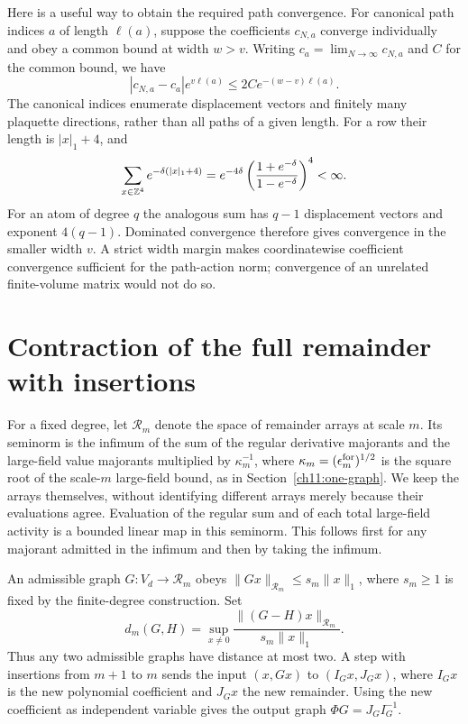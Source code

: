 Here is a useful way to obtain the required path convergence. For
canonical path indices $a$ of length $\ell(a)$, suppose the coefficients
$c_{N,a}$ converge individually and obey a common bound at width
$w>v$. Writing $c_a=\lim_{N\to\infty}c_{N,a}$ and $C$ for the common bound, we have
\[
 |c_{N,a}-c_a|e^{v\ell(a)}\le 2C e^{-(w-v)\ell(a)}.
\]
The canonical indices enumerate displacement vectors and finitely many
plaquette directions, rather than all paths of a given length. For a
row their length is $|x|_1+4$, and
\[
 \sum_{x\in\mathbb Z^4}e^{-\delta(|x|_1+4)}
 =e^{-4\delta}\left(\frac{1+e^{-\delta}}{1-e^{-\delta}}\right)^4<\infty.
\]
For an atom of degree $q$ the analogous sum has $q-1$ displacement
vectors and exponent $4(q-1)$. Dominated convergence therefore gives
convergence in the smaller width $v$. A strict width margin makes
coordinatewise coefficient convergence sufficient for the
path-action norm; convergence of an unrelated finite-volume matrix
would not do so.

\section{Contraction of the full remainder with insertions}
\label{ch12:graphs}

For a fixed degree, let $\mathcal R_m$ denote the space of remainder
arrays at scale $m$. Its seminorm is the infimum of the sum of the
regular derivative majorants and the large-field value majorants
multiplied by $\kappa_m^{-1}$, where
$\kappa_m=(\epsilon_m^{\rm for})^{1/2}$ is the square root of the
scale-$m$ large-field bound, as in
Section~\ref{ch11:one-graph}. We keep the arrays themselves, without
identifying different arrays merely because their evaluations agree.
Evaluation of the regular sum and of each total large-field activity is a
bounded linear map in this seminorm. This follows first for any
majorant admitted in the infimum and then by taking the infimum.

An admissible graph $G:V_d\to\mathcal R_m$ obeys
$\|Gx\|_{\mathcal R_m}\le s_m\|x\|_1$, where $s_m\ge1$ is fixed
by the finite-degree construction. Set
\[
 d_m(G,H)=\sup_{x\ne0}
       \frac{\|(G-H)x\|_{\mathcal R_m}}{s_m\|x\|_1}.
\]
Thus any two admissible graphs have distance at most two. A step with insertions
from $m+1$ to $m$ sends the input $(x,Gx)$ to $(I_Gx,J_Gx)$, where
$I_Gx$ is the new polynomial coefficient and $J_Gx$ the new remainder.
Using the new coefficient as independent variable gives the output graph
$\Phi G=J_GI_G^{-1}$.

